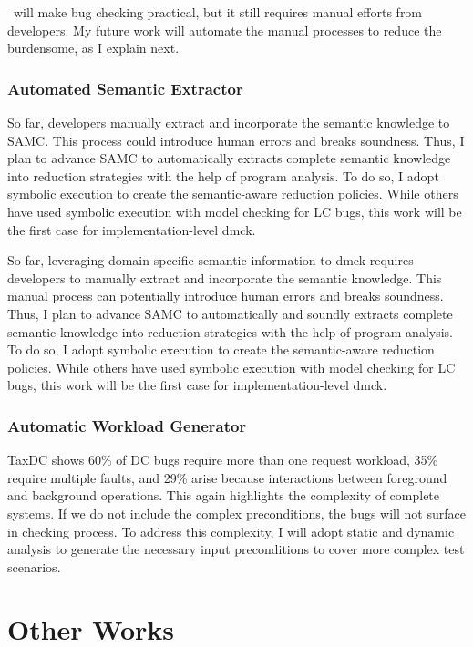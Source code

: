 \documentclass[11pt]{article}
\begin{document}
\fullcheck\ will make bug checking practical, but it still requires manual
efforts from developers. My future work will automate the manual processes
to reduce the burdensome, as I explain next.

\subsubsection*{Automated Semantic Extractor}

So far, developers manually extract and incorporate the semantic knowledge to
SAMC. This process could introduce human errors and breaks soundness. Thus, I
plan to advance SAMC to automatically extracts complete semantic
knowledge into reduction strategies with the help of program analysis. To do
so, I adopt symbolic execution to create the semantic-aware reduction policies.
While others have used symbolic execution with model checking for LC bugs, this
work will be the first case for implementation-level dmck. 

So far, leveraging domain-specific semantic information to dmck requires
developers to manually extract and incorporate the semantic knowledge. This
manual process can potentially introduce human errors and breaks soundness.
Thus, I plan to advance SAMC to automatically and soundly extracts complete
semantic knowledge into reduction strategies with the help of program analysis.
To do so, I adopt symbolic execution to create the semantic-aware reduction
policies. While others have used symbolic execution with model checking for LC
bugs, this work will be the first case for implementation-level dmck. 
\fi

\subsubsection*{Automatic Workload Generator}

TaxDC shows 60\% of DC bugs require more than one request workload,
35\% require multiple faults, and 29\% arise because
interactions between foreground and background operations. This again highlights
the complexity of complete systems. If we do not include the complex
preconditions, the bugs will not surface in checking process. To address this
complexity, I will adopt static and dynamic analysis to generate the necessary
input preconditions to cover more complex test scenarios.

\section{Other Works}
\end{document}
